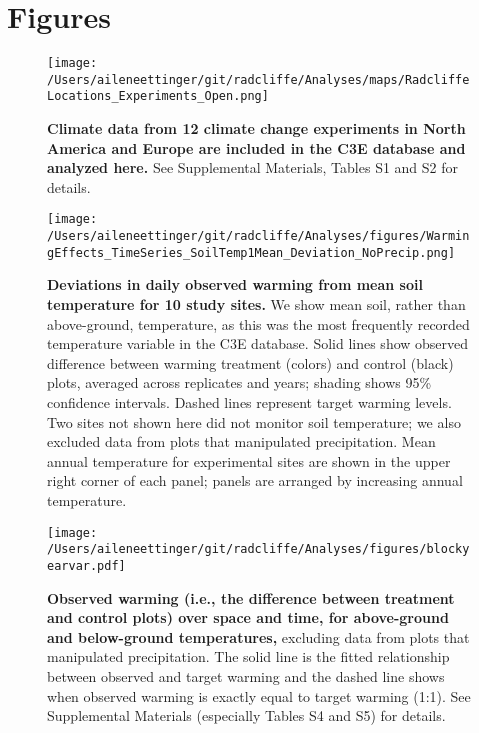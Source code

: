 \documentclass{article}
\begin{document}
\section* {Figures}
\begin{figure}[p]
\centering
\texttt{[image: /Users/aileneettinger/git/radcliffe/Analyses/maps/RadcliffeLocations\_Experiments\_Open.png]} 
\caption{\textbf{Climate data from 12 climate change experiments in North America and Europe are included in the C3E database and analyzed here.} See Supplemental Materials, Tables S1 and S2 for details.} 
 \label{fig:map}
 \end{figure}
\clearpage
\begin{figure}[h]
\centering
 \texttt{[image: /Users/aileneettinger/git/radcliffe/Analyses/figures/WarmingEffects\_TimeSeries\_SoilTemp1Mean\_Deviation\_NoPrecip.png]}
 \caption{\textbf{Deviations in daily observed warming from mean soil temperature for 10 study sites.} We show mean soil, rather than above-ground, temperature, as this was the most frequently recorded temperature variable in the C3E database. Solid lines show observed difference between warming treatment (colors) and control (black) plots, averaged across replicates and years; shading shows 95\% confidence intervals. Dashed lines represent target warming levels. Two sites not shown here did not monitor soil temperature; we also excluded data from plots that manipulated precipitation. Mean annual temperature for experimental sites are shown in the upper right corner of each panel; panels are arranged by increasing annual temperature.} %
 \label{fig:effwarm}
 \end{figure}
 \begin{figure}[p]
   \centering
 \texttt{[image: /Users/aileneettinger/git/radcliffe/Analyses/figures/blockyearvar.pdf]}  
 \caption{\textbf{Observed warming (i.e., the difference between treatment and control plots) over space and time, for above-ground and below-ground temperatures,} excluding data from plots that manipulated precipitation. The solid line is the fitted relationship between observed and target warming and the dashed line shows when observed warming is exactly equal to target warming (1:1). See Supplemental Materials (especially Tables S4 and S5) for details.}
 \label{fig:blockyear}
 \end{figure}
 
\end{document}

